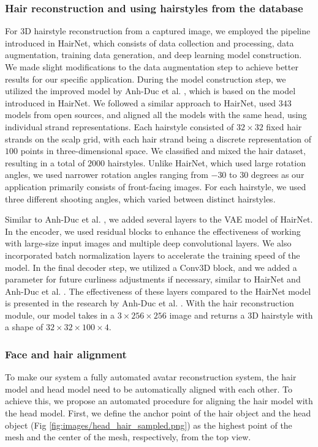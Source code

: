 \subsubsection{Hair reconstruction and using hairstyles from the database}

For 3D hairstyle reconstruction from a captured image, we employed the pipeline introduced in HairNet, which consists of data collection and processing, data augmentation, training data generation, and deep learning model construction. We made slight modifications to the data augmentation step to achieve better results for our specific application. During the model construction step, we utilized the improved model by Anh-Duc et al. \cite{Duc}, which is based on the model introduced in HairNet. We followed a similar approach to HairNet, used $343$ models from open sources, and aligned all the models with the same head, using individual strand representations. Each hairstyle consisted of $32\times32$ fixed hair strands on the scalp grid, with each hair strand being a discrete representation of $100$ points in three-dimensional space. We classified and mixed the hair dataset, resulting in a total of $2000$ hairstyles. Unlike HairNet, which used large rotation angles, we used narrower rotation angles ranging from $-30$ to $30$ degrees as our application primarily consists of front-facing images. For each hairstyle, we used three different shooting angles, which varied between distinct hairstyles.

Similar to Anh-Duc et al. \cite{Duc}, we added several layers to the VAE model of HairNet. In the encoder, we used residual blocks to enhance the effectiveness of working with large-size input images and multiple deep convolutional layers. We also incorporated batch normalization layers to accelerate the training speed of the model. In the final decoder step, we utilized a Conv3D block, and we added a parameter for future curliness adjustments if necessary, similar to HairNet and Anh-Duc et al. \cite{Duc}. The effectiveness of these layers compared to the HairNet model is presented in the research by Anh-Duc et al. \cite{Duc}. With the hair reconstruction module, our model takes in a $3 \times 256 \times 256$ image and returns a 3D hairstyle with a shape of $32 \times 32 \times 100 \times 4$.

\subsubsection{Face and hair alignment}
To make our system a fully automated avatar reconstruction system, the hair model and head model need to be automatically aligned with each other. To achieve this, we propose an automated procedure for aligning the hair model with the head model.
First, we define the anchor point of the hair object and the head object (Fig \ref{fig:images/head_hair_sampled.png}) as the highest point of the mesh and the center of the mesh, respectively, from the top view.


